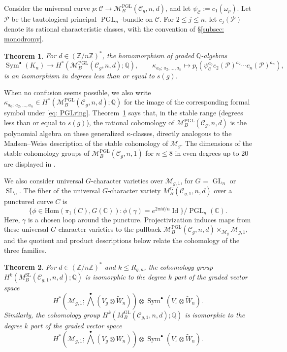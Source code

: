 \documentclass[11pt,reqno]{amsart}
\theoremstyle{plain} %
\newtheorem{theorem}{Theorem}[section]
\theoremstyle{definition}
\newcommand{\QQ}{\mathbb{Q}}
\newcommand{\CC}{\mathbb{C}}
\newcommand{\Hom}{\mathrm{Hom}}
\newcommand{\M}{\mathcal{M}}
\newcommand{\C}{\mathcal{C}}
\newcommand{\ZZ}{\mathbb{Z}}
\DeclareMathOperator{\Id}{Id}
\DeclareMathOperator{\GL}{GL}
\DeclareMathOperator{\SL}{SL}
\DeclareMathOperator{\PGL}{PGL}
\DeclareMathOperator{\Sym}{Sym}
\newcommand{\tW}{\widetilde{W}}
\begin{document}
Consider the universal curve $p\colon\C\longrightarrow\M_B^{\PGL}(\C_g,n,d)$, and let $\psi_\C := c_1(\omega_p)$. Let $\mathcal P$ be the tautological principal $\PGL_n$-bundle on $\C$. For $2\leq j\leq n$, let $c_j(\mathcal P)$ denote its rational characteristic classes, with the convention of \S\ref{subsec: monodromy}.

\begin{theorem} \label{thm:stablePGL}
For $d \in (\ZZ/n\ZZ)^*$, the homomorphism of graded $\QQ$-algebras
\begin{equation}\label{eq: PGLring}
\Sym^\bullet (K_n) \longrightarrow H^*(\M_B^{\PGL}(\C_g, n,d); \QQ), \qquad \kappa_{a_0;\,a_2,\ldots,a_n} \longmapsto p_!\left(\psi_\C^{a_0}c_2(\mathcal P)^{a_2}\cdots c_n(\mathcal P)^{a_n}\right),
\end{equation}
is an isomorphism in degrees less than or equal to $s(g)$.
\end{theorem}

\noindent When no confusion seems possible, we also write $\kappa_{a_0;\,a_2,\ldots,a_n} \in H^*(\M_B^{\PGL}(\C_g, n,d); \QQ)$ for the image of the corresponding formal symbol under \eqref{eq: PGLring}. Theorem~\ref{thm:stablePGL} says that, in the stable range (degrees less than or equal to $s(g)$), the rational cohomology of $\M_B^{\PGL}(\C_g, n,d)$ is the polynomial algebra on these generalized $\kappa$-classes, directly analogous to the Madsen--Weiss description of the stable cohomology of $\M_g$. The dimensions of the stable cohomology groups of $\M_B^{\PGL}(\C_g, n, 1)$ for $n \leq 8$ in even degrees up to 20 are displayed in .



\medskip



We also consider universal $G$-character varieties over $\M_{g,1}$, for $G$ = $\GL_n$ or $\SL_n$.  The fiber of the universal $G$-character variety $M^{G}_B(\C_{g,1}, n, d)$ over a punctured curve $C$ is 
$$\{ \phi \in \Hom(\pi_1(C), G(\CC)): \phi(\gamma) = e^{2\pi i d/n} \Id\}/\PGL_n(\CC).$$
Here, $\gamma$ is a chosen loop around the puncture. Projectivization induces maps from these universal $G$-character varieties to the pullback $\M_B^{\PGL}(\C_g,n,d) \times_{\M_g} \M_{g,1}$, and the quotient and product descriptions below relate the cohomology of the three families. 


\begin{theorem}\label{thm:sl-stability-answer}
For $d \in (\ZZ/n\ZZ)^*$ and $k\leq R_{g,n}$, the cohomology group  $H^k(M^{\SL}_B(\C_{g,1}, n, d);\QQ)$ is isomorphic to the degree $k$ part of the graded vector space
    \[
H^*(\M_{g,1}; \textstyle{\bigwedge^\bullet}(V_g \otimes \tW_n)) \otimes \Sym^\bullet(V_\circ \otimes \tW_n).
    \]
    Similarly, the cohomology group  $H^k(M^{\GL}_B(\C_{g,1}, n, d);\QQ)$ is isomorphic to the degree $k$ part of the graded vector space
    \[
H^*(\M_{g,1}; \textstyle{\bigwedge^\bullet}(V_g \otimes W_n)) \otimes \Sym^\bullet(V_\circ \otimes \tW_n).
    \]
    \end{theorem}
    
\end{document}
